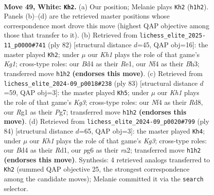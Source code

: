 \documentclass[11pt]{article}
\begin{document}
\clearpage

\begin{figure}[p]\centering
\begin{subfigure}{0.46\textwidth}\centering
\resizebox{\linewidth}{!}{%
\newchessgame
\chessboard[
  setfen={r1kb4/1p5p/n5pP/p4p2/P2BrN2/3R2P1/8/6RK w - - 5 49},
  showmover=false,
  pgfstyle=straightmove, color=movearrow, markmove={h1-h2}
]}
\caption{}
\end{subfigure}\hfill
\begin{subfigure}{0.46\textwidth}\centering
\resizebox{\linewidth}{!}{%
\newchessgame
\chessboard[
  setfen={4r1k1/1b5p/p3p1p1/4P3/3p1P2/2r4B/P7/4RRK1 w - - 1 42},
  showmover=false,
  pgfstyle=straightmove, color=movearrow, markmove={g1-h2}
]}
\caption{}
\end{subfigure}
\\[4pt]
\begin{subfigure}{0.46\textwidth}\centering
\resizebox{\linewidth}{!}{%
\newchessgame
\chessboard[
  setfen={1r1r4/6pp/2nPR1k1/1bP5/1p6/P5P1/1N3RBP/6K1 b - - 3 42},
  showmover=false,
  pgfstyle=straightmove, color=movearrow, markmove={g6-h5}
]}
\caption{}
\end{subfigure}\hfill
\begin{subfigure}{0.46\textwidth}\centering
\resizebox{\linewidth}{!}{%
\newchessgame
\chessboard[
  setfen={6k1/7p/3p4/4bPP1/1pPp2N1/1P1R2K1/r1r5/3R4 w - - 1 43},
  showmover=false,
  pgfstyle=straightmove, color=movearrow, markmove={g3-h4}
]}
\caption{}
\end{subfigure}
\caption{\textbf{Move 49, White: \texttt{Kh2}.} (a) Our position; Melanie plays \texttt{Kh2} (\texttt{h1h2}). Panels (b)--(d) are the retrieved master positions whose correspondence most drove this move (highest QAP objective among those that transfer to it). (b) Retrieved from \texttt{lichess\_elite\_2025-11\_p0000\#741} (ply 82) [structural distance $d$=45, QAP obj=16]: the master played \texttt{Kh2}; under $\mu$ our \emph{Kh1} plays the role of that game's \emph{Kg1}; cross-type roles: our \emph{B}d4 as their \emph{R}e1, our \emph{N}f4 as their \emph{B}h3; transferred move \texttt{h1h2} \textbf{(endorses this move)}. (c) Retrieved from \texttt{lichess\_elite\_2024-09\_p0018\#238} (ply 83) [structural distance $d$=59, QAP obj=3]: the master played \texttt{Kh5}; under $\mu$ our \emph{Kh1} plays the role of that game's \emph{Kg3}; cross-type roles: our \emph{N}f4 as their \emph{R}d8, our \emph{R}g1 as their \emph{P}g7; transferred move \texttt{h1h2} \textbf{(endorses this move)}. (d) Retrieved from \texttt{lichess\_elite\_2024-09\_p0020\#799} (ply 84) [structural distance $d$=65, QAP obj=3]: the master played \texttt{Kh4}; under $\mu$ our \emph{Kh1} plays the role of that game's \emph{Kg3}; cross-type roles: our \emph{B}d4 as their \emph{R}d1, our \emph{p}g6 as their \emph{r}a2; transferred move \texttt{h1h2} \textbf{(endorses this move)}. Synthesis: 4 retrieved analogs transferred to \texttt{Kh2} (summed QAP objective 25, the strongest correspondence among the candidate moves); Melanie committed it via the \texttt{search} selector.}
\label{fig:thought-m96}
\end{figure}
\end{document}
